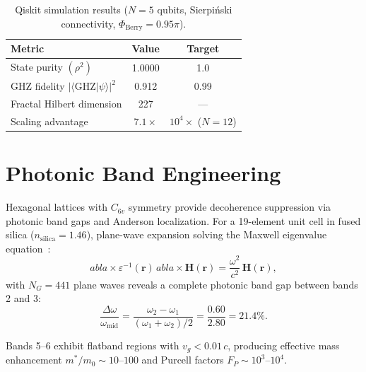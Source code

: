 \documentclass[aps,prx,twocolumn,groupedaddress,longbibliography]{revtex4-2}
\theoremstyle{plain}
\theoremstyle{definition}
\begin{document}
\begin{table}[h]
\caption{Qiskit simulation results ($N = 5$ qubits, Sierpi\'{n}ski connectivity, $\Phi_\mathrm{Berry} = 0.95\pi$).}
\label{tab:qiskit}
\begin{ruledtabular}
\begin{tabular}{lcc}
\textbf{Metric} & \textbf{Value} & \textbf{Target} \\
\hline
State purity $(\rho^2)$ & 1.0000 & 1.0 \\
GHZ fidelity $|\langle\mathrm{GHZ}|\psi\rangle|^2$ & 0.912 & 0.99 \\
Fractal Hilbert dimension & 227 & --- \\
Scaling advantage & $7.1\times$ & $10^4\times$ ($N{=}12$) \\
\end{tabular}
\end{ruledtabular}
\end{table}


\section{Photonic Band Engineering}
\label{sec:photonics}

Hexagonal lattices with $C_{6v}$ symmetry provide decoherence suppression via photonic band gaps and Anderson localization. For a 19-element unit cell in fused silica ($n_\mathrm{silica} = 1.46$), plane-wave expansion solving the Maxwell eigenvalue equation~\cite{Joannopoulos2008}:
\begin{equation}

abla \times \varepsilon^{-1}(\mathbf{r})\,
abla \times \mathbf{H}(\mathbf{r}) = \frac{\omega^2}{c^2}\,\mathbf{H}(\mathbf{r}),
\end{equation}
with $N_G = 441$ plane waves reveals a complete photonic band gap between bands 2 and 3:
\begin{equation}
\frac{\Delta\omega}{\omega_\mathrm{mid}} = \frac{\omega_2 - \omega_1}{(\omega_1 + \omega_2)/2} = \frac{0.60}{2.80} = 21.4\%.
\end{equation}

Bands 5--6 exhibit flatband regions with $v_g < 0.01\,c$, producing effective mass enhancement $m^*/m_0 \sim 10$--$100$ and Purcell factors $F_P \sim 10^3$--$10^4$.
\end{document}
